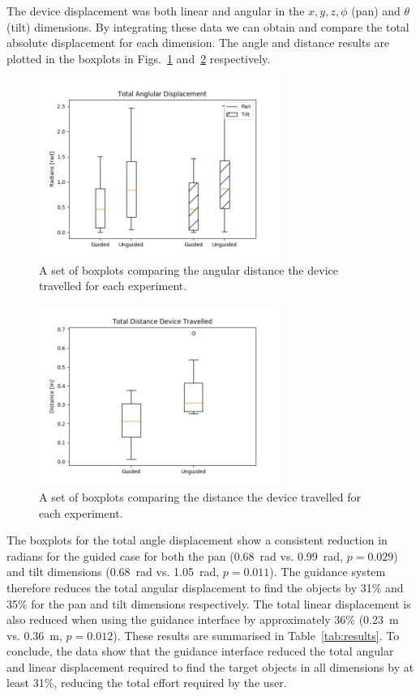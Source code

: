 \documentclass[runningheads]{llncs}
\begin{document}
The device displacement was both linear and angular in the $x, y, z, \phi$ (pan) and $\theta$ (tilt) dimensions.
By integrating these data we can obtain and compare the total absolute displacement for each dimension.
The angle and distance results are plotted in the boxplots in Figs.~\ref{fig:boxplot-angle} and~\ref{fig:boxplot-dist} respectively. 

\begin{figure}
  \centering
  \includegraphics[width=0.7\textwidth]{figures/boxplot_angle.png}
  \caption{A set of boxplots comparing the angular distance the device travelled for each experiment. }\label{fig:boxplot-angle}
\end{figure}

\begin{figure}
  \centering
  \includegraphics[width=0.7\textwidth]{figures/boxplot_dist.png}
  \caption{A set of boxplots comparing the distance the device travelled for each experiment. }\label{fig:boxplot-dist}
\end{figure}

The boxplots for the total angle displacement show a consistent reduction in radians for the guided case for both the pan (\SI{0.68}{\radian} vs. \SI{0.99}{\radian}, $p=0.029$) and tilt dimensions (\SI{0.68}{\radian} vs. \SI{1.05}{\radian}, $p=0.011$). 
The guidance system therefore reduces the total angular displacement to find the objects by 31\% and 35\% for the pan and tilt dimensions respectively. 
The total linear displacement is also reduced when using the guidance interface by approximately 36\% (\SI{0.23}{\metre} vs. \SI{0.36}{\metre}, $p=0.012$).
These results are summarised in Table~\ref{tab:results}.
To conclude, the data show that the guidance interface reduced the total angular and linear displacement required to find the target objects in all dimensions by at least 31\%, reducing the total effort required by the user. 
\end{document}
